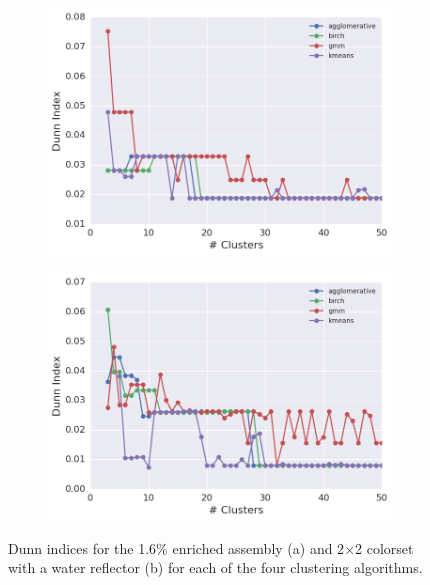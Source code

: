 \begin{figure}[h!]
\centering
\begin{subfigure}{\textwidth}
  \centering
\includegraphics[width=0.9\linewidth]{figures/results/model-select/assm-16/dunn-combined-U238-capture-1}
\vspace{2mm}
  \caption{}
  \label{fig:chap11-assm-16-dunn-index}
\end{subfigure}
\begin{subfigure}{\textwidth}
  \centering
\includegraphics[width=0.9\linewidth]{figures/results/model-select/reflector/dunn-combined-U238-nu-fission-1}
  \caption{}
\label{fig:chap11-refl-dunn-index}
\end{subfigure}
\caption[Dunn indices]{Dunn indices for the 1.6\% enriched assembly (a) and 2$\times$2 colorset with a water reflector (b) for each of the four clustering algorithms.}
\label{fig:chap11-dunn-indices}
\end{figure}

